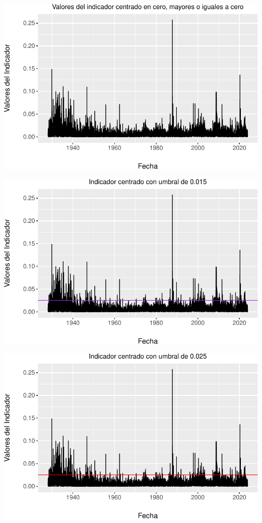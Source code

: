 \documentclass[
  oneside]{article}
\begin{document}
\includegraphics{Entrega_Laura_Montaldo_files/figure-latex/unnamed-chunk-22-1.pdf}

\includegraphics{Entrega_Laura_Montaldo_files/figure-latex/unnamed-chunk-23-1.pdf}

\includegraphics{Entrega_Laura_Montaldo_files/figure-latex/unnamed-chunk-24-1.pdf}
\end{document}
